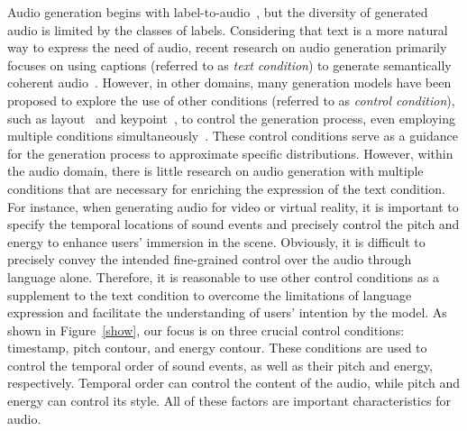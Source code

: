 \documentclass[letterpaper]{article}
\begin{document}
Audio generation begins with label-to-audio~\cite{fullband2023pascual,csg2021liu}, but the diversity of generated audio is limited by the classes of labels. Considering that text is a more natural way to express the need of audio, recent research on audio generation primarily focuses on using captions (referred to as \textit{text condition}) to generate semantically coherent audio~\cite{yang2022diffsound,kreuk2022audiogen,liu2023audioldm,huang2023makeanaudio,ghosal2023tango}. However, in other domains, many generation models have been proposed to explore the use of other conditions (referred to as  \textit{control condition}), such as layout~\cite{li2021collagingcg} and keypoint~\cite{he2023latentkeypointgan}, to control the generation process, even employing multiple conditions simultaneously~\cite{li2023gligen}. These control conditions serve as a guidance for the generation process to approximate specific distributions. However, within the audio domain, there is little research on audio generation with multiple conditions that are necessary for enriching the expression of the text condition. For instance, when generating audio for video or virtual reality, it is important to specify the temporal locations of sound events and precisely control the pitch and energy to enhance users' immersion in the scene. Obviously, it is difficult to precisely convey the intended fine-grained control over the audio through language alone. Therefore, it is reasonable to use other control conditions as a supplement to the text condition to overcome the limitations of language expression and facilitate the understanding of users' intention by the model. As shown in Figure~\ref{show}, our focus is on three crucial control conditions: timestamp, pitch contour, and energy contour. These conditions are used to control the temporal order of sound events, as well as their pitch and energy, respectively. Temporal order can control the content of the audio, while pitch and energy can control its style. All of these factors are important characteristics for audio.
\end{document}
